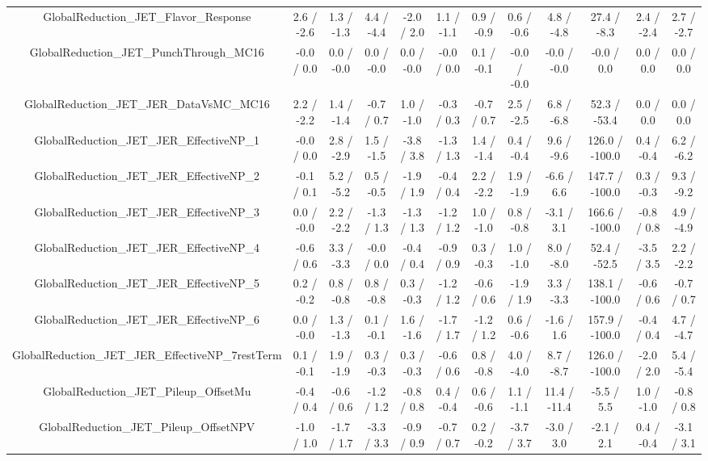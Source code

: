 \begin{table}[htbp]
\begin{center}
\begin{tabular}{|c|c|c|c|c|c|c|c|c|c|c|c|}
  GlobalReduction_JET_Flavor_Response & 2.6 / -2.6 & 1.3 / -1.3 & 4.4 / -4.4 & -2.0 / 2.0 & 1.1 / -1.1 & 0.9 / -0.9 & 0.6 / -0.6 & 4.8 / -4.8 & 27.4 / -8.3 & 2.4 / -2.4 & 2.7 / -2.7 \\ 
  GlobalReduction_JET_PunchThrough_MC16 & -0.0 / 0.0 & 0.0 / -0.0 & 0.0 / -0.0 & 0.0 / -0.0 & -0.0 / 0.0 & 0.1 / -0.1 & -0.0 / -0.0 & -0.0 / -0.0 & -0.0 / 0.0 & 0.0 / 0.0 & 0.0 / 0.0 \\ 
  GlobalReduction_JET_JER_DataVsMC_MC16 & 2.2 / -2.2 & 1.4 / -1.4 & -0.7 / 0.7 & 1.0 / -1.0 & -0.3 / 0.3 & -0.7 / 0.7 & 2.5 / -2.5 & 6.8 / -6.8 & 52.3 / -53.4 & 0.0 / 0.0 & 0.0 / 0.0 \\ 
  GlobalReduction_JET_JER_EffectiveNP_1 & -0.0 / 0.0 & 2.8 / -2.9 & 1.5 / -1.5 & -3.8 / 3.8 & -1.3 / 1.3 & 1.4 / -1.4 & 0.4 / -0.4 & 9.6 / -9.6 & 126.0 / -100.0 & 0.4 / -0.4 & 6.2 / -6.2 \\ 
  GlobalReduction_JET_JER_EffectiveNP_2 & -0.1 / 0.1 & 5.2 / -5.2 & 0.5 / -0.5 & -1.9 / 1.9 & -0.4 / 0.4 & 2.2 / -2.2 & 1.9 / -1.9 & -6.6 / 6.6 & 147.7 / -100.0 & 0.3 / -0.3 & 9.3 / -9.2 \\ 
  GlobalReduction_JET_JER_EffectiveNP_3 & 0.0 / -0.0 & 2.2 / -2.2 & -1.3 / 1.3 & -1.3 / 1.3 & -1.2 / 1.2 & 1.0 / -1.0 & 0.8 / -0.8 & -3.1 / 3.1 & 166.6 / -100.0 & -0.8 / 0.8 & 4.9 / -4.9 \\ 
  GlobalReduction_JET_JER_EffectiveNP_4 & -0.6 / 0.6 & 3.3 / -3.3 & -0.0 / 0.0 & -0.4 / 0.4 & -0.9 / 0.9 & 0.3 / -0.3 & 1.0 / -1.0 & 8.0 / -8.0 & 52.4 / -52.5 & -3.5 / 3.5 & 2.2 / -2.2 \\ 
  GlobalReduction_JET_JER_EffectiveNP_5 & 0.2 / -0.2 & 0.8 / -0.8 & 0.8 / -0.8 & 0.3 / -0.3 & -1.2 / 1.2 & -0.6 / 0.6 & -1.9 / 1.9 & 3.3 / -3.3 & 138.1 / -100.0 & -0.6 / 0.6 & -0.7 / 0.7 \\ 
  GlobalReduction_JET_JER_EffectiveNP_6 & 0.0 / -0.0 & 1.3 / -1.3 & 0.1 / -0.1 & 1.6 / -1.6 & -1.7 / 1.7 & -1.2 / 1.2 & 0.6 / -0.6 & -1.6 / 1.6 & 157.9 / -100.0 & -0.4 / 0.4 & 4.7 / -4.7 \\ 
  GlobalReduction_JET_JER_EffectiveNP_7restTerm & 0.1 / -0.1 & 1.9 / -1.9 & 0.3 / -0.3 & 0.3 / -0.3 & -0.6 / 0.6 & 0.8 / -0.8 & 4.0 / -4.0 & 8.7 / -8.7 & 126.0 / -100.0 & -2.0 / 2.0 & 5.4 / -5.4 \\ 
  GlobalReduction_JET_Pileup_OffsetMu & -0.4 / 0.4 & -0.6 / 0.6 & -1.2 / 1.2 & -0.8 / 0.8 & 0.4 / -0.4 & 0.6 / -0.6 & 1.1 / -1.1 & 11.4 / -11.4 & -5.5 / 5.5 & 1.0 / -1.0 & -0.8 / 0.8 \\ 
  GlobalReduction_JET_Pileup_OffsetNPV & -1.0 / 1.0 & -1.7 / 1.7 & -3.3 / 3.3 & -0.9 / 0.9 & -0.7 / 0.7 & 0.2 / -0.2 & -3.7 / 3.7 & -3.0 / 3.0 & -2.1 / 2.1 & 0.4 / -0.4 & -3.1 / 3.1 \\ 

\end{tabular}
\end{center}
\end{table}
